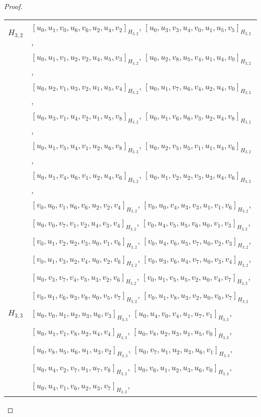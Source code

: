 \begin{subappendices}
\begin{proof}
{ \small
\begin{longtable}{|c|l|}
\hline
$H_{3,2}$ &
  $[u_0, u_1, v_0, u_6, v_6, u_2, u_4, v_2]_{H_{3,2}}$,
  $[u_0, u_3, v_3, u_4, v_0, u_1, u_5, v_5]_{H_{3,2}}$, \\* &
  $[u_0, u_1, v_1, u_2, v_2, u_4, u_5, v_3]_{H_{3,2}}$,
  $[u_0, u_2, v_8, u_5, v_4, u_1, u_4, v_0]_{H_{3,2}}$, \\* &
  $[u_0, u_2, v_1, u_3, v_2, u_1, u_5, v_4]_{H_{3,2}}$,
  $[u_0, u_1, v_7, u_6, v_4, u_2, u_4, v_0]_{H_{3,2}}$, \\* &
  $[u_0, u_3, v_1, u_4, v_2, u_1, u_5, v_8]_{H_{3,2}}$,
  $[u_0, u_1, v_6, u_6, v_3, u_2, u_4, v_8]_{H_{3,2}}$, \\* &
  $[u_0, u_1, v_5, u_4, v_1, u_2, u_6, v_8]_{H_{3,2}}$,
  $[u_0, u_2, v_5, u_5, v_1, u_1, u_4, v_6]_{H_{3,2}}$, \\* &
  $[u_0, u_1, v_4, u_6, v_1, u_2, u_4, v_6]_{H_{3,2}}$,
  $[u_0, u_1, v_2, u_2, v_3, u_3, u_4, v_6]_{H_{3,2}}$, \\* &
  $[v_0, u_0, v_1, u_6, v_6, u_2, v_2, v_4]_{H_{3,2}}$,
  $[v_0, u_0, v_4, u_3, v_3, u_1, v_1, v_6]_{H_{3,2}}$, \\* &
  $[u_0, v_0, v_7, v_1, v_2, u_4, v_3, v_4]_{H_{3,2}}$,
  $[v_0, u_4, v_5, u_5, v_6, u_0, v_1, v_3]_{H_{3,2}}$, \\* &
  $[v_0, u_1, v_2, u_2, v_3, u_0, v_1, v_6]_{H_{3,2}}$,
  $[v_0, u_4, v_6, u_5, v_7, u_0, v_2, v_3]_{H_{3,2}}$, \\* &
  $[v_0, u_1, v_3, u_2, v_4, u_0, v_2, v_6]_{H_{3,2}}$,
  $[v_0, u_3, v_6, u_4, v_7, u_0, v_3, v_4]_{H_{3,2}}$, \\* &
  $[u_0, v_3, v_7, v_4, v_5, u_3, v_2, v_6]_{H_{3,2}}$,
  $[v_0, u_1, v_5, u_5, v_2, u_0, v_4, v_7]_{H_{3,2}}$, \\* &
  $[v_0, u_1, v_6, u_3, v_8, u_0, v_5, v_7]_{H_{3,2}}$,
  $[v_0, u_1, v_8, u_3, v_2, u_0, v_6, v_7]_{H_{3,2}}$
\\ \hline
$H_{3,3}$ &
  $[u_0, v_0, u_1, u_2, u_3, u_6, v_3]_{H_{3,3}}$,
  $[u_0, u_4, v_0, v_4, u_1, u_7, v_1]_{H_{3,3}}$, \\* &
  $[u_0, u_1, v_1, v_8, u_2, u_4, v_4]_{H_{3,3}}$,
  $[u_0, v_8, u_2, u_3, u_1, u_5, v_0]_{H_{3,3}}$, \\* &
  $[u_0, v_8, u_5, u_6, u_1, u_3, v_2]_{H_{3,3}}$,
  $[u_0, v_7, u_1, u_2, u_3, u_6, v_1]_{H_{3,3}}$, \\* &
  $[u_0, u_4, v_2, v_7, u_1, u_7, v_8]_{H_{3,3}}$,
  $[u_0, v_6, u_1, u_2, u_3, u_6, v_0]_{H_{3,3}}$, \\* &
  $[u_0, u_4, v_1, v_6, u_2, u_3, v_7]_{H_{3,3}}$,

\end{longtable}}
\end{proof}
\end{subappendices}
